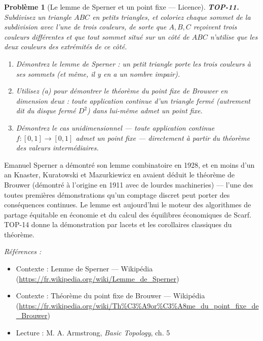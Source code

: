 \documentclass[11pt]{article}
\newtheorem{problem}{Problème}
\newenvironment{refs}{\par\small\noindent\emph{Références :}\begin{itemize}\setlength\itemsep{0pt}}{\end{itemize}\normalsize}
\begin{document}
\bigskip

\begin{problem}[{Le lemme de Sperner et un point fixe --- Licence}]
\textbf{TOP-11.} Subdivisez un triangle $ ABC $ en petits triangles, et coloriez chaque sommet de
la subdivision avec l'une de trois couleurs, de sorte que $ A, B, C $ reçoivent trois couleurs
différentes et que tout sommet situé sur un côté de $ ABC $ n'utilise que les deux couleurs des
extrémités de ce côté.
\begin{enumerate}
\item[(a)] Démontrez le lemme de Sperner : un petit triangle porte les trois couleurs à ses sommets (et même,
il y en a un nombre impair).
\item[(b)] Utilisez (a) pour démontrer le théorème du point fixe de Brouwer en dimension deux : toute
application continue d'un triangle fermé (autrement dit du disque fermé $ D^2 $) dans lui-même admet
un point fixe.
\item[(c)] Démontrez le cas unidimensionnel --- toute application continue $ f : [0,1] \to [0,1] $ admet un
point fixe --- directement à partir du théorème des valeurs intermédiaires.
\end{enumerate}

\end{problem}

\noindent Emanuel Sperner a démontré son lemme combinatoire en 1928, et en moins d'un an
Knaster, Kuratowski et Mazurkiewicz en avaient déduit le théorème de Brouwer (démontré à l'origine en
1911 avec de lourdes machineries) --- l'une des toutes premières démonstrations qu'un comptage discret peut
porter des conséquences continues. Le lemme est aujourd'hui le moteur des algorithmes de partage équitable
en économie et du calcul des équilibres économiques de Scarf. TOP-14 donne la démonstration par lacets et
les corollaires classiques du théorème.

\begin{refs}
\item Contexte : Lemme de Sperner --- Wikipédia (\url{https://fr.wikipedia.org/wiki/Lemme_de_Sperner})
\item Contexte : Théorème du point fixe de Brouwer --- Wikipédia (\url{https://fr.wikipedia.org/wiki/Th%C3%A9or%C3%A8me_du_point_fixe_de_Brouwer})
\item Lecture : M. A. Armstrong, \textit{Basic Topology}, ch. 5
\end{refs}

\bigskip
\end{document}
